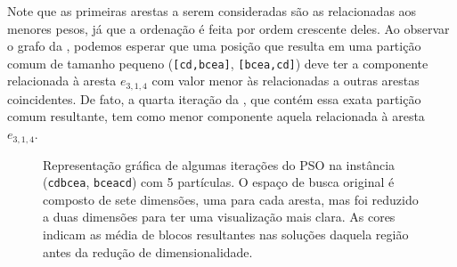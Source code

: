     \newpage

    Note que as primeiras arestas a serem consideradas são as relacionadas aos menores pesos, já que a ordenação é feita por ordem crescente deles. Ao observar o grafo da , podemos esperar que uma posição que resulta em uma partição comum de tamanho pequeno (\texttt{[cd,bcea]}, \texttt{[bcea,cd]}) deve ter a componente relacionada à aresta $e_{3,1,4}$ com valor menor às relacionadas a outras arestas coincidentes. De fato, a quarta iteração da , que contém essa exata partição comum resultante, tem como menor componente aquela relacionada à aresta $e_{3,1,4}$.

    \begin{figure}[htb]
        \centering
        \newcommand{\mathdefault}[1][]{}


        \caption{Representação gráfica de algumas iterações do PSO na instância (\texttt{cdbcea}, \texttt{bceacd}) com 5 partículas. O espaço de busca original é composto de sete dimensões, uma para cada aresta, mas foi reduzido a duas dimensões para ter uma visualização mais clara. As cores indicam as média de blocos resultantes nas soluções daquela região antes da redução de dimensionalidade.}
        \label{fig:pso-iter-example}
    \end{figure}
